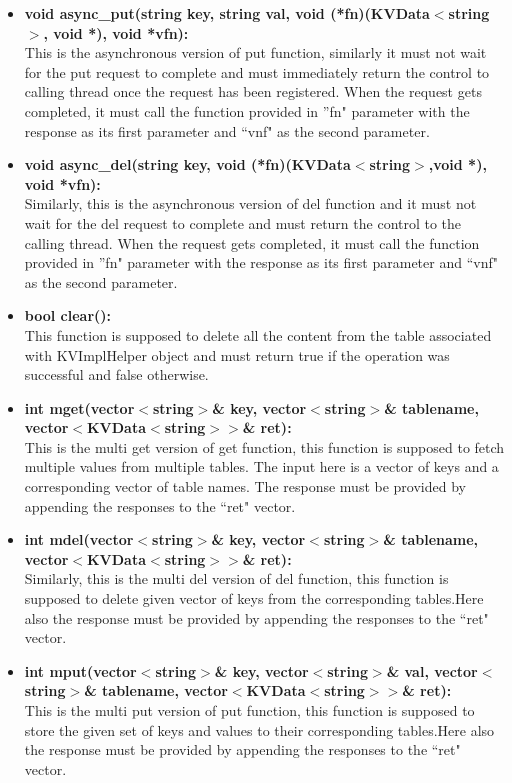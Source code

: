 \documentclass[11pt]{article}
\begin{document}
\begin{itemize}
\item \textbf{void async\_put(string key, string val, void (*fn)(KVData$<$string$>$, void *), void *vfn):}\\
This is the asynchronous version of put function, similarly it must not wait for the put request to complete and must immediately return the control to calling thread once the request has been registered. When the request gets completed, it must call the function provided in ''fn" parameter with the response as its first parameter and ``vnf" as the second parameter.

\item \textbf{void async\_del(string key, void (*fn)(KVData$<$string$>$,void *), void *vfn):}\\
Similarly, this is the asynchronous version of del function and it must not wait for the del request to complete and must return the control to the calling thread. When the request gets completed, it must call the function provided in ''fn" parameter with the response as its first parameter and ``vnf" as the second parameter.

\item \textbf{bool clear():}\\
This function is supposed to delete all the content from the table associated with KVImplHelper object and must return true if the operation was successful and false otherwise.

\item \textbf{int mget(vector$<$string$>$\& key, vector$<$string$>$\& tablename, vector$<$KVData$<$string$>$$>$\& ret):}\\
This is the multi get version of get function, this function is supposed to fetch multiple values from multiple tables. The input here is a vector of keys and a corresponding vector of table names. The response must be provided by appending the responses to the ``ret" vector. 

\item \textbf{int mdel(vector$<$string$>$\& key, vector$<$string$>$\& tablename, vector$<$KVData$<$string$>$$>$\& ret):}\\
Similarly, this is the multi del version of del function, this function is supposed to delete given vector of keys from the corresponding tables.Here also the response must be provided by appending the responses to the ``ret" vector. 

\item \textbf{int mput(vector$<$string$>$\& key, vector$<$string$>$\& val, vector$<$string$>$\& tablename, vector$<$KVData$<$string$>$$>$\& ret):}\\
This is the multi put version of put function, this function is supposed to store the given set of keys and values to their corresponding tables.Here also the response must be provided by appending the responses to the ``ret" vector.


\end{itemize}
\end{document}
